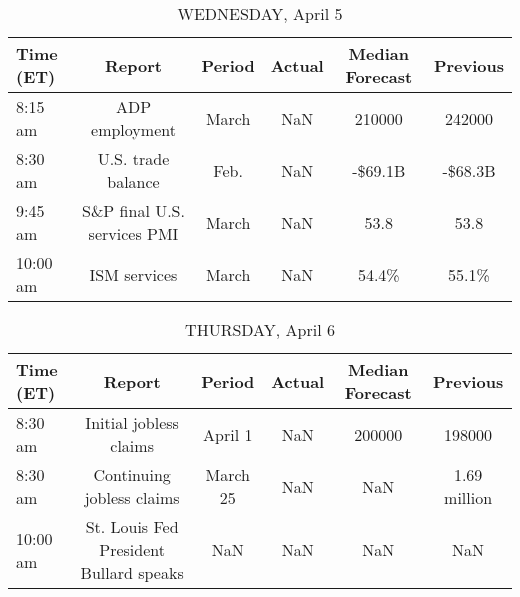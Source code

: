 \documentclass{article}%
\begin{document}
\begin{table}[htbp]%
\caption{WEDNESDAY, April 5}%
\centering%
\begin{adjustbox}{width=1\textwidth}%
\begin{tabular}{lccccc}
\toprule
Time (ET) &                      Report & Period & Actual & Median Forecast & Previous \\
\midrule
  8:15 am &              ADP employment &  March &    NaN &          210000 &   242000 \\
  8:30 am &          U.S. trade balance &   Feb. &    NaN &         -\$69.1B &  -\$68.3B \\
  9:45 am & S\&P final U.S. services PMI &  March &    NaN &            53.8 &     53.8 \\
 10:00 am &                ISM services &  March &    NaN &           54.4\% &    55.1\% \\
\bottomrule
\end{tabular}
%
\end{adjustbox}%
\end{table}

%


\begin{table}[htbp]%
\caption{THURSDAY, April 6}%
\centering%
\begin{adjustbox}{width=1\textwidth}%
\begin{tabular}{lccccc}
\toprule
Time (ET) &                                 Report &   Period & Actual & Median Forecast &     Previous \\
\midrule
  8:30 am &                 Initial jobless claims &  April 1 &    NaN &          200000 &       198000 \\
  8:30 am &              Continuing jobless claims & March 25 &    NaN &             NaN & 1.69 million \\
 10:00 am & St. Louis Fed President Bullard speaks &      NaN &    NaN &             NaN &          NaN \\
\bottomrule
\end{tabular}
%
\end{adjustbox}%
\end{table}

%
\end{document}
